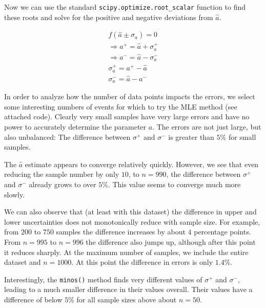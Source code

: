 Now we can use the standard \texttt{scipy.optimize.root\_scalar} function to find these roots and solve for the positive and negative deviations from \( \hat{a} \).

\begin{gather}
    f(\hat{a} \pm \sigma_a) = 0 \\
    \Rightarrow a^+ = \hat{a} + \sigma_a^+ \\
    \Rightarrow a^- = \hat{a} - \sigma_a^- \\
    \sigma_a^+ = a^+ - \hat{a} \\
    \sigma_a^- = \hat{a} - a^-
\end{gather}


In order to analyze how the number of data points impacts the errors, we select some interesting numbers of events for which to try the MLE method (see attached code). Clearly very small samples have very large errors and have no power to accurately determine the parameter $a$. The errors are not just large, but also unbalanced: The difference between $\sigma^+$ and $\sigma^-$ is greater than $5 \%$ for small samples.

The $\hat{a}$ estimate appears to converge relatively quickly. However, we see that even reducing the sample number by only $10$, to $n = 990$, the difference between $\sigma^+$ and $\sigma^-$ already grows to over $5 \%$. This value seems to converge much more slowly.

We can also observe that (at least with this dataset) the difference in upper and lower uncertainties does not monotonically reduce with sample size. For example, from $200$ to $750$ samples the difference increases by about $4$ percentage points. From $n = 995$ to $n = 996$ the difference also jumps up, although after this point it reduces sharply. At the maximum number of samples, we include the entire dataset and $n = 1000$. At this point the difference in errors is only $1.4 \%$.

Interestingly, the \texttt{minos()} method finds very different values of $\sigma^+$ and $\sigma^-$, leading to a much smaller difference in their values overall. Their values have a difference of below $5 \%$ for all sample sizes above about $n = 50$.